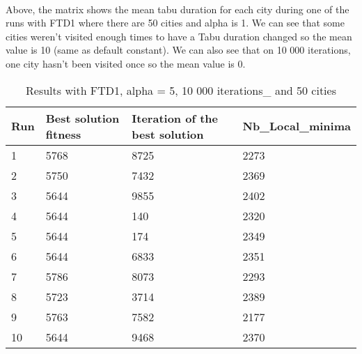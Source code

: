 \documentclass[12pt,oneside,a4paper]{article}
\begin{document}
\paragraph{}
Above, the matrix shows the mean tabu duration for each city during one of the runs with FTD1
where there are 50 cities and alpha is 1. We can see that some cities weren't visited enough times
to have a Tabu duration changed so the mean value is 10 (same as default constant). We can also
see that on 10 000 iterations, one city hasn't been visited once so the mean value is 0.

\newpage
\begin{table}[h]
  \centering
  \small
  \begin{tabular}{llll}
    \hline
    \multicolumn{1}{|l|}{\textbf{Run}}& \multicolumn{1}{l|}{\textbf{Best solution fitness}}& \multicolumn{1}{l|}{\textbf{Iteration of the best solution}}& \multicolumn{1}{l|}{\textbf{Nb\_Local\_minima}}\\ \hline
    \multicolumn{1}{|l|}{1} & \multicolumn{1}{l|}{5768}  & \multicolumn{1}{l|}{8725} & \multicolumn{1}{l|}{2273}  \\ \hline
    \multicolumn{1}{|l|}{2} & \multicolumn{1}{l|}{5750}  & \multicolumn{1}{l|}{7432} & \multicolumn{1}{l|}{2369}  \\ \hline         
    \multicolumn{1}{|l|}{3} & \multicolumn{1}{l|}{5644}  & \multicolumn{1}{l|}{9855}  & \multicolumn{1}{l|}{2402}  \\ \hline
    \multicolumn{1}{|l|}{4} & \multicolumn{1}{l|}{5644}  & \multicolumn{1}{l|}{140}  & \multicolumn{1}{l|}{2320}  \\ \hline
    \multicolumn{1}{|l|}{5} & \multicolumn{1}{l|}{5644}  & \multicolumn{1}{l|}{174}  & \multicolumn{1}{l|}{2349}  \\ \hline
    \multicolumn{1}{|l|}{6} & \multicolumn{1}{l|}{5644}  & \multicolumn{1}{l|}{6833}  & \multicolumn{1}{l|}{2351}  \\ \hline
    \multicolumn{1}{|l|}{7} & \multicolumn{1}{l|}{5786}  & \multicolumn{1}{l|}{8073}  & \multicolumn{1}{l|}{2293}  \\ \hline
    \multicolumn{1}{|l|}{8} & \multicolumn{1}{l|}{5723}  & \multicolumn{1}{l|}{3714} & \multicolumn{1}{l|}{2389}  \\ \hline
    \multicolumn{1}{|l|}{9} & \multicolumn{1}{l|}{5763}  & \multicolumn{1}{l|}{7582} & \multicolumn{1}{l|}{2177}  \\ \hline
    \multicolumn{1}{|l|}{10} & \multicolumn{1}{l|}{5644}  & \multicolumn{1}{l|}{9468} & \multicolumn{1}{l|}{2370}  \\ \hline
  \end{tabular}
  \caption{Results with FTD1, alpha = 5, 10 000 iterations\_ and 50 cities}
\end{table}
\end{document}
